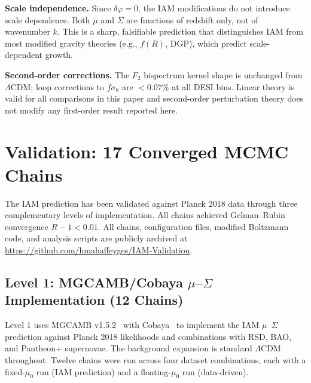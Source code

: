 \documentclass[twocolumn,a4paper,aps,prd,twocolumn,showpacs,notitlepage,superscriptaddress,nofootinbib]{article}
\newcommand{\LCDM}{$\Lambda$CDM}
\begin{document}
\textbf{Scale independence.}  Since $\delta\varphi = 0$, the IAM modifications
do not introduce scale dependence.  Both $\mu$ and $\Sigma$ are functions of
redshift only, not of wavenumber $k$.  This is a sharp, falsifiable prediction
that distinguishes IAM from most modified gravity theories (e.g., $f(R)$, DGP),
which predict scale-dependent growth.

\textbf{Second-order corrections.}  The $F_2$ bispectrum kernel shape is unchanged
from \LCDM{}; loop corrections to $f\sigma_8$ are $<0.07\%$ at all DESI bins.
Linear theory is valid for all comparisons in this paper and second-order perturbation
theory does not modify any first-order result reported here.

\section{Validation: 17 Converged MCMC Chains}
\label{sec:validation}

The IAM prediction has been validated against Planck 2018 data through three
complementary levels of implementation.  All chains achieved Gelman--Rubin
convergence $R - 1 < 0.01$.  All chains, configuration files, modified
Boltzmann code, and analysis scripts are publicly archived at
\url{https://github.com/hmahaffeyges/IAM-Validation}.

\subsection{Level 1: MGCAMB/Cobaya $\mu$--$\Sigma$ Implementation (12 Chains)}
\label{sec:level1}

Level 1 uses MGCAMB v1.5.2~\citep{MGCAMB} with Cobaya~\citep{Cobaya} to
implement the IAM $\mu$--$\Sigma$ prediction against Planck 2018 likelihoods
and combinations with RSD, BAO, and Pantheon+ supernovae.
The background expansion is standard \LCDM{} throughout.  Twelve chains were run
across four dataset combinations, each with a fixed-$\mu_0$ run (IAM prediction)
and a floating-$\mu_0$ run (data-driven).
\end{document}
